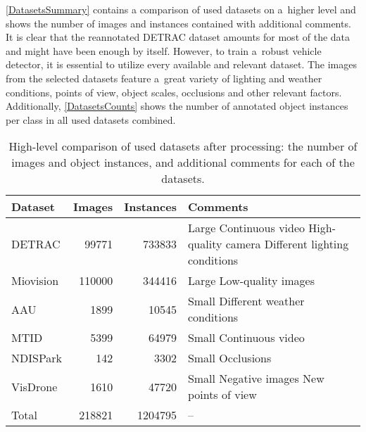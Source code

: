 \autoref{DatasetsSummary} contains a comparison of used datasets on a~higher
level and shows the number of images and instances contained with additional
comments. It is clear that the reannotated DETRAC dataset amounts for most of
the data and might have been enough by itself. However, to train a~robust
vehicle detector, it is essential to utilize every available and relevant
dataset. The images from the selected datasets feature a~great variety of
lighting and weather conditions, points of view, object scales, occlusions and
other relevant factors. Additionally, \autoref{DatasetsCounts} shows the number
of annotated object instances per class in all used datasets combined.

\begin{table}[t]
    \centering
    \begin{threeparttable}
        \begin{tabular}{|l|rr|p{5cm}|}
            \hline
            Dataset     & Images        & Instances    & Comments \\
            \hline
            DETRAC      &  \num{99771}  & \num{733833} & Large \newline Continuous video \newline High-quality camera \newline Different lighting conditions \\
            \hline
            Miovision   &  \num{110000} & \num{344416} & Large \newline Low-quality images \\
            \hline
            AAU         &    \num{1899} &  \num{10545} & Small \newline Different weather conditions \\
            \hline
            MTID        &    \num{5399} &  \num{64979} & Small \newline Continuous video \\
            \hline
            NDISPark    &     \num{142} &   \num{3302} & Small \newline Occlusions \\
            \hline
            VisDrone    &    \num{1610} &  \num{47720} & Small \newline Negative images \newline New points of view \\
            \hline
            \hline
            Total       &  \num{218821} & \num{1204795} & -- \\
            \hline
        \end{tabular}
        \caption{High-level comparison of used datasets after processing: the number of
        images and object instances, and additional comments for each of the datasets.}
        \label{DatasetsSummary}
    \end{threeparttable}
\end{table}

